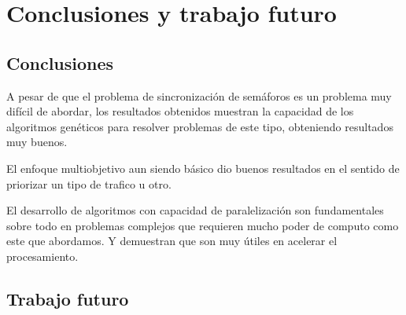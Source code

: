 \chapter{Conclusiones y trabajo futuro}

\section{Conclusiones}
A pesar de que el problema de sincronización de semáforos es un problema muy difícil de abordar, los resultados obtenidos
muestran la capacidad de los algoritmos genéticos para resolver problemas de este tipo, obteniendo resultados muy buenos. 

El enfoque multiobjetivo aun siendo básico dio buenos resultados en el sentido de priorizar un tipo de trafico u otro.

El desarrollo de algoritmos con capacidad de paralelización son fundamentales sobre  todo en problemas complejos que requieren mucho poder de computo como este que abordamos. Y demuestran que son muy útiles en acelerar el procesamiento.
\section{Trabajo futuro}
